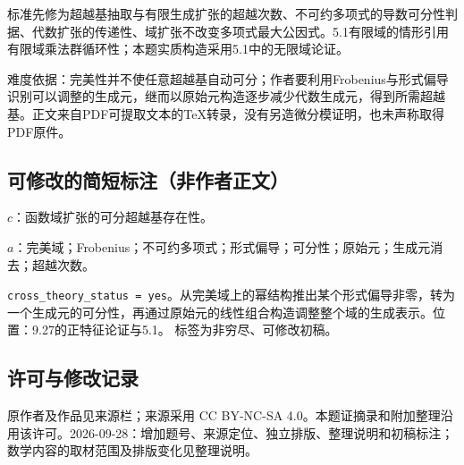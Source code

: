 \documentclass[UTF8,11pt]{ctexart}
\theoremstyle{definition}
\begin{document}
标准先修为超越基抽取与有限生成扩张的超越次数、不可约多项式的导数可分性判据、代数扩张的传递性、域扩张不改变多项式最大公因式。5.1有限域的情形引用有限域乘法群循环性；本题实质构造采用5.1中的无限域论证。

难度依据：完美性并不使任意超越基自动可分；作者要利用Frobenius与形式偏导识别可以调整的生成元，继而以原始元构造逐步减少代数生成元，得到所需超越基。正文来自PDF可提取文本的TeX转录，没有另造微分模证明，也未声称取得PDF原件。
\subsection*{可修改的简短标注（非作者正文）}
$c$：函数域扩张的可分超越基存在性。

$a$：完美域；Frobenius；不可约多项式；形式偏导；可分性；原始元；生成元消去；超越次数。

\texttt{cross\_theory\_status = yes}。从完美域上的幂结构推出某个形式偏导非零，转为一个生成元的可分性，再通过原始元的线性组合构造调整整个域的生成表示。位置：9.27的正特征论证与5.1。
标签为非穷尽、可修改初稿。
\subsection*{许可与修改记录}
原作者及作品见来源栏；来源采用 CC BY-NC-SA 4.0。本题证摘录和附加整理沿用该许可。2026-09-28：增加题号、来源定位、独立排版、整理说明和初稿标注；数学内容的取材范围及排版变化见整理说明。
\end{document}
